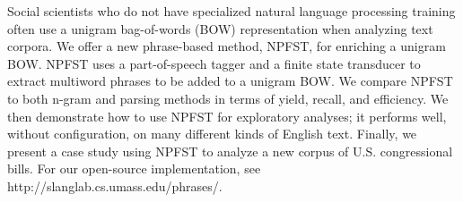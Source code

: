 Social scientists who do not have specialized natural language processing training often use a unigram bag-of-words (BOW) representation when analyzing text corpora. We offer a new phrase-based method, NPFST, for enriching a unigram BOW. NPFST uses a part-of-speech tagger and a finite state transducer to extract multiword phrases to be added to a unigram BOW. We compare NPFST to both n-gram and parsing methods in terms of yield, recall, and efficiency. We then demonstrate how to use NPFST for exploratory analyses; it performs well, without configuration, on many different kinds of English text. Finally, we present a case study using NPFST to analyze a new corpus of U.S. congressional bills. For our open-source implementation, see http://slanglab.cs.umass.edu/phrases/.
